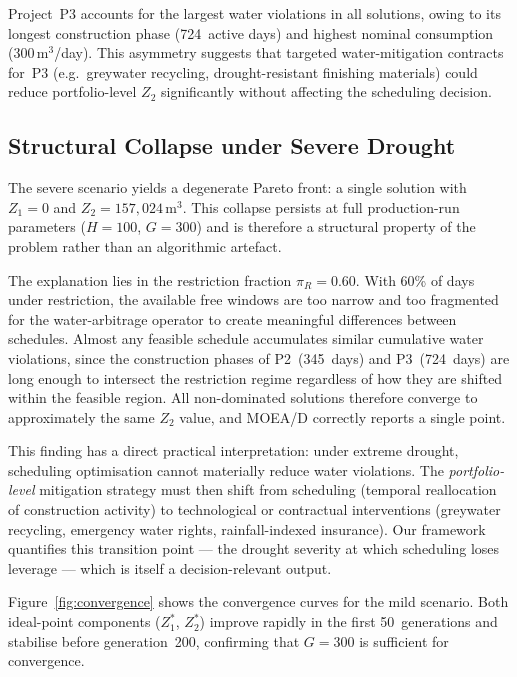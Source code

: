 \documentclass[12pt,a4paper]{article}
\newcommand{\Z}[1]{Z_{#1}}
\begin{document}
Project~P3 accounts for the largest water violations in all solutions, owing to its
longest construction phase (724~active days) and highest nominal consumption
(300\,m$^3$/day).  This asymmetry suggests that targeted water-mitigation contracts
for~P3 (e.g.\ greywater recycling, drought-resistant finishing materials) could
reduce portfolio-level $\Z{2}$ significantly without affecting the scheduling
decision.

\subsection{Structural Collapse under Severe Drought}
\label{sec:results:severe}

The severe scenario yields a degenerate Pareto front: a single solution with
$\Z{1} = 0$ and $\Z{2} = 157{,}024$\,m$^3$.  This collapse persists at full
production-run parameters ($H = 100$, $G = 300$) and is therefore a structural
property of the problem rather than an algorithmic artefact.

The explanation lies in the restriction fraction $\pi_R = 0.60$.  With 60\% of days
under restriction, the available free windows are too narrow and too fragmented for
the water-arbitrage operator to create meaningful differences between schedules.
Almost any feasible schedule accumulates similar cumulative water violations, since
the construction phases of P2~(345~days) and P3~(724~days) are long enough to
intersect the restriction regime regardless of how they are shifted within the
feasible region.  All non-dominated solutions therefore converge to approximately
the same $\Z{2}$ value, and MOEA/D correctly reports a single point.

This finding has a direct practical interpretation: under extreme drought, scheduling
optimisation cannot materially reduce water violations.  The \emph{portfolio-level}
mitigation strategy must then shift from scheduling (temporal reallocation of
construction activity) to technological or contractual interventions (greywater
recycling, emergency water rights, rainfall-indexed insurance).  Our framework
quantifies this transition point — the drought severity at which scheduling loses
leverage — which is itself a decision-relevant output.

Figure~\ref{fig:convergence} shows the convergence curves for the mild scenario.
Both ideal-point components ($Z_1^*$, $Z_2^*$) improve rapidly in the first
50~generations and stabilise before generation~200, confirming that $G = 300$ is
sufficient for convergence.
\end{document}
